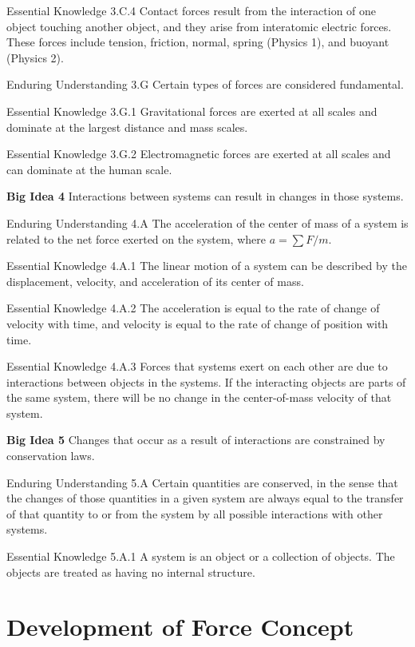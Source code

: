 \documentclass[
]{book}
\begin{document}
Essential Knowledge 3.C.4 Contact forces result from the interaction of
one object touching another object, and they arise from interatomic
electric forces. These forces include tension, friction, normal, spring
(Physics 1), and buoyant (Physics 2).

Enduring Understanding 3.G Certain types of forces are considered
fundamental.

Essential Knowledge 3.G.1 Gravitational forces are exerted at all scales
and dominate at the largest distance and mass scales.

Essential Knowledge 3.G.2 Electromagnetic forces are exerted at all
scales and can dominate at the human scale.

\textbf{Big Idea 4} Interactions between systems can result in changes in
those systems.

Enduring Understanding 4.A The acceleration of the center of mass of a
system is related to the net force exerted on the system, where
\(a = {\sum{F/m}}\).

Essential Knowledge 4.A.1 The linear motion of a system can be described
by the displacement, velocity, and acceleration of its center of mass.

Essential Knowledge 4.A.2 The acceleration is equal to the rate of
change of velocity with time, and velocity is equal to the rate of
change of position with time.

Essential Knowledge 4.A.3 Forces that systems exert on each other are
due to interactions between objects in the systems. If the interacting
objects are parts of the same system, there will be no change in the
center-of-mass velocity of that system.

\textbf{Big Idea 5} Changes that occur as a result of interactions are
constrained by conservation laws.

Enduring Understanding 5.A Certain quantities are conserved, in the
sense that the changes of those quantities in a given system are always
equal to the transfer of that quantity to or from the system by all
possible interactions with other systems.

Essential Knowledge 5.A.1 A system is an object or a collection of
objects. The objects are treated as having no internal structure.

\hypertarget{concept-trailer-newtons-laws}{}

\hypertarget{development-of-force-concept}{%
\section{Development of Force Concept}\label{development-of-force-concept}}
\end{document}
